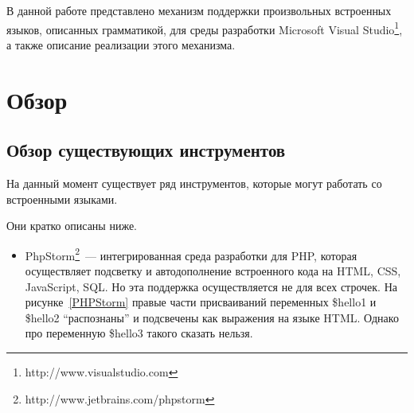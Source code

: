 В данной работе представлено механизм поддержки произвольных встроенных языков, описанных грамматикой, для среды разработки Microsoft Visual Studio\footnote{http://www.visualstudio.com}, а также описание реализации этого механизма. 

\section{Обзор}
\subsection{Обзор существующих инструментов}
На данный момент существует ряд инструментов, которые могут работать со встроенными языками. 

Они кратко описаны ниже. 
\begin{itemize}
\item
{
    PhpStorm\footnote{http://www.jetbrains.com/phpstorm}~--- интегрированная среда разработки для PHP, которая осуществляет подсветку и автодополнение встроенного кода на HTML, CSS, JavaScript, SQL. Но эта поддержка осуществляется не для всех строчек. На рисунке~\ref{PHPStorm} правые части присваиваний переменных \$hello1 и \$hello2 ``распознаны'' и подсвечены как выражения на языке HTML. Однако про переменную \$hello3 такого сказать нельзя.

}
\end{itemize}
